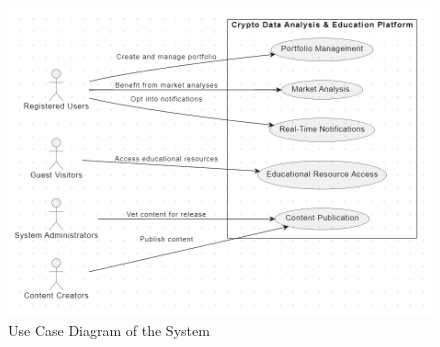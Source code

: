 \documentclass[12pt]{report}
\begin{document}
\clearpage %
\begin{figure}[p] %
\centering %
\includegraphics[width=\textwidth,height=\textheight,keepaspectratio]{use-case.png} %
\caption{Use Case Diagram of the System} %
\label{fig:er_diagram} %
\end{figure}
\clearpage %
\end{document}
